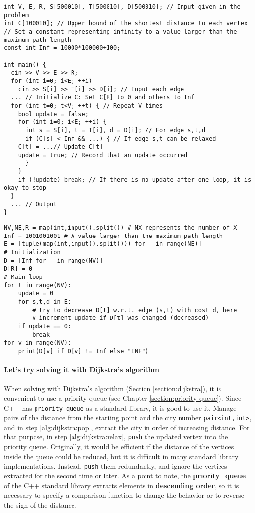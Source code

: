 \begin{cbox}
\begin{verbatim}
int V, E, R, S[500010], T[500010], D[500010]; // Input given in the problem
int C[100010]; // Upper bound of the shortest distance to each vertex
// Set a constant representing infinity to a value larger than the maximum path length
const int Inf = 10000*100000+100;

int main() {
  cin >> V >> E >> R;
  for (int i=0; i<E; ++i) 
    cin >> S[i] >> T[i] >> D[i]; // Input each edge
  ... // Initialize C: Set C[R] to 0 and others to Inf
  for (int t=0; t<V; ++t) { // Repeat V times
    bool update = false;
    for (int i=0; i<E; ++i) {
      int s = S[i], t = T[i], d = D[i]; // For edge s,t,d
      if (C[s] < Inf && ...) { // If edge s,t can be relaxed
	C[t] = ...// Update C[t]
	update = true; // Record that an update occurred
      }
    }
    if (!update) break; // If there is no update after one loop, it is okay to stop
  }
  ... // Output
}
\end{verbatim}
\end{cbox}

\begin{pybox}
\begin{verbatim}
NV,NE,R = map(int,input().split()) # NX represents the number of X
Inf = 1001001001 # A value larger than the maximum path length
E = [tuple(map(int,input().split())) for _ in range(NE)]
# Initialization
D = [Inf for _ in range(NV)]
D[R] = 0
# Main loop
for t in range(NV):
    update = 0
    for s,t,d in E:
        # try to decrease D[t] w.r.t. edge (s,t) with cost d, here
        # increment update if D[t] was changed (decreased)
    if update == 0:
        break
for v in range(NV):
    print(D[v] if D[v] != Inf else "INF")
\end{verbatim}
\end{pybox}

\paragraph{Let's try solving it with Dijkstra's algorithm}
When solving with Dijkstra's algorithm (Section \ref{section:dijkstra}), it is convenient to use a priority queue
(see Chapter \ref{section:priority-queue}).
Since C++ has \texttt{priority\_queue} as a standard library, it is good to use it.
Manage pairs of the distance from the starting point and the city number \texttt{pair<int,int>}, and in step \ref{alg:dijkstra:pop},
extract the city in order of increasing distance. For that purpose, in step \ref{alg:dijkstra:relax},
\texttt{push} the updated vertex into the priority queue.
Originally, it would be efficient if the distance of the vertices inside the queue could be reduced, but it is difficult in many standard library implementations. Instead, \texttt{push} them redundantly, and ignore the vertices extracted for the second time or later.
As a point to note, the \textbf{priority\_queue} of the C++ standard library extracts elements in \textbf{descending order}, so it is necessary to specify a comparison function to change the behavior or to reverse the sign of the distance.

